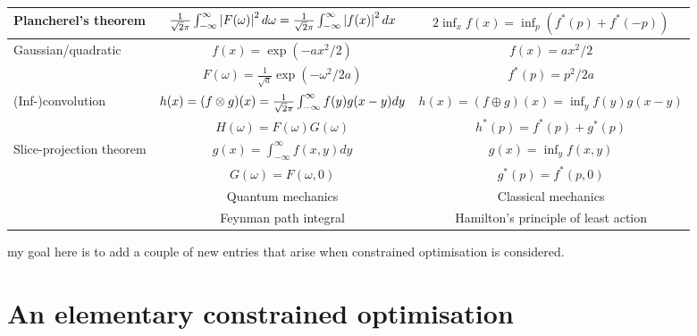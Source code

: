 \documentclass[10pt]{article}
\begin{document}
\begin{tabular}{| l | c | c |}
\hline

Plancherel's theorem & $\frac{1}{\sqrt2\pi}\int_{-\infty}^{\infty}\left|F(\omega)\right|^2d\omega = \frac{1}{\sqrt2\pi}\int_{-\infty}^{\infty}\left|f(x)\right|^2dx$ & $2\inf_x f(x) = \inf_p(f^\ast(p)+f^\ast(-p))$ \\

\hline

Gaussian/quadratic & $f(x) = \exp(-ax^2/2)$ & $f(x) = ax^2/2$ \\
& $F(\omega) = \frac{1}{\sqrt{a}}\exp(-\omega^2/2a)$ & $f^\ast(p) = p^2/2a$ \\

\hline

(Inf-)convolution & $h(x) = (f\otimes g)(x) = \frac{1}{\sqrt2\pi}\int_{-\infty}^{\infty} f(y)g(x-y)dy$ & $h(x) = (f\oplus g)(x) = \inf_y f(y)g(x-y)$ \\
& $H(\omega) = F(\omega)G(\omega)$ & $h^\ast(p) = f^\ast(p)+g^\ast(p)$ \\

\hline

Slice-projection theorem & $g(x)=\int_{-\infty}^\infty f(x,y)dy$ & $g(x)=\inf_y f(x,y)$ \\

& $G(\omega) = F(\omega,0)$ & $g^\ast(p) = f^\ast(p,0)$ \\
\hline

& Quantum mechanics & Classical mechanics \\

\hline

& Feynman path integral & Hamilton's principle of least action \\

\hline

\end{tabular}

my goal here is to add a couple of new entries that arise when constrained optimisation is considered.

\section{An elementary constrained optimisation}
\label{sec:opt}
\end{document}
